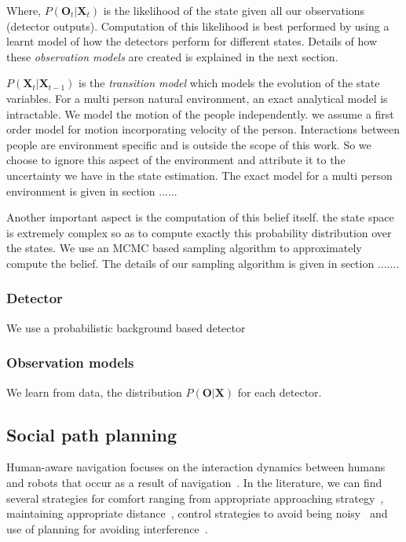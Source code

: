 Where, $P(\textbf{O}_{t} | \textbf{X}_{t})$ is the likelihood of the state given all our observations (detector outputs). Computation of this likelihood is best performed by using a learnt model of how the detectors perform for different states. Details of how these \textit{observation models} are created is explained in the next section.

$P(\textbf{X}_{t}|\textbf{X}_{t-1})$ is the \textit{transition model} which models the evolution of the state variables. For a multi person natural environment, an exact analytical model is intractable. We model the motion of the people independently. we assume a first order model for motion incorporating velocity of the person. Interactions between people are environment specific and is outside the scope of this work. So we choose to ignore this aspect of the environment and attribute it to the uncertainty we have in the state estimation. The exact model for a multi person environment is given in section ......

Another important aspect is the computation of this belief itself. the state space is extremely complex so as to compute exactly this probability 
distribution over the states. We use an MCMC based sampling algorithm to approximately compute the belief. The details of our sampling algorithm is given in section .......


\subsubsection{Detector}
We use a probabilistic background based detector
\subsubsection{Observation models}
We learn from data, the distribution $P(\textbf{O}|\textbf{X})$ for each detector.



\subsection{Social path planning}

Human-aware navigation focuses on the interaction dynamics between humans and robots that occur as a result of navigation~\cite{Kruse2013}. 
In the literature, we can find several strategies for comfort ranging from appropriate approaching strategy~\cite{Dautenhahn2006}, maintaining appropriate distance~\cite{Takayama2009}, control strategies to avoid being noisy~\cite{Martinson2007} and use of planning for avoiding interference~\cite{Vasquez2012}.

